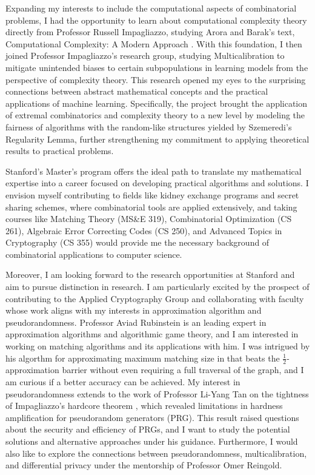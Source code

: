 \documentclass[12pt]{article}
\begin{document}
Expanding my interests to include the computational aspects of combinatorial problems, I had the
opportunity to learn about computational complexity theory directly from Professor Russell
Impagliazzo, studying Arora and Barak's text, Computational Complexity: A Modern Approach
\cite{arora2009computational}. With this foundation, I then joined Professor Impagliazzo's research
group, studying Multicalibration to mitigate unintended biases to certain subpopulations in learning
models from the perspective of complexity theory. This research opened my eyes to the surprising
connections between abstract mathematical concepts and the practical applications of machine
learning. Specifically, the project brought the application of extremal combinatorics and complexity
theory to a new level by modeling the fairness of algorithms with the random-like structures yielded
by Szemeredi's Regularity Lemma, further strengthening my commitment to applying theoretical results
to practical problems.

Stanford's Master's program offers the ideal path to translate my mathematical expertise into a
career focused on developing practical algorithms and solutions. I envision myself contributing to
fields like kidney exchange programs and secret sharing schemes, where combinatorial tools are
applied extensively, and taking courses like Matching Theory (MS\&E 319), Combinatorial Optimization
(CS 261), Algebraic Error Correcting Codes (CS 250), and Advanced Topics in Cryptography (CS 355)
would provide me the necessary background of combinatorial applications to computer science. 

Moreover, I am looking forward to the research opportunities at Stanford and aim to pursue
distinction in research. I am particularly excited by the prospect of contributing to the Applied
Cryptography Group and collaborating with faculty whose work aligns with my interests in
approximation algorithm and pseudorandomness. Professor Aviad Rubinstein is an leading expert in
approximation algorithms and algorithmic game theory, and I am interested in working on matching
algorithms and its applications with him. I was intrigued by his algorthm for approximating maximum
matching size in \cite{doi:10.1137/1.9781611977554.ch151} that beats the $\frac{1}{2}$-approximation
barrier without even requiring a full traversal of the graph, and I am curious if a better accuracy
can be achieved. My interest in pseudorandomness extends to the work of Professor Li-Yang Tan on the
tightness of Impagliazzo's hardcore theorem \cite{blanc2024samplecomplexitysmoothboosting}, which
revealed limitations in hardness amplification for pseudorandom generators (PRG). This result raised
questions about the security and efficiency of PRGs, and I want to study the potential solutions and
alternative approaches under his guidance. Furthermore, I would also like to explore the connections
between pseudorandomness, multicalibration, and differential privacy under the mentorship of
Professor Omer Reingold.
\end{document}
